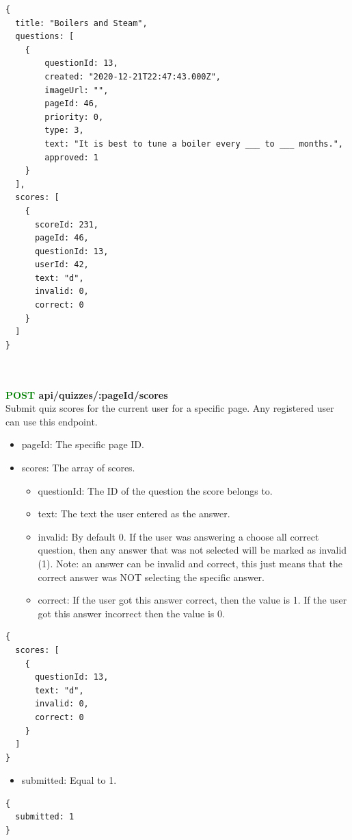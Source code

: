 \documentclass[onecolumn, draftclsnofoot,10pt, compsoc, usenames, dvipsnames]{IEEEtran}
\begin{document}
\begin{lstlisting}[caption=Example Response]
{ 
  title: "Boilers and Steam",
  questions: [
    {
        questionId: 13,
        created: "2020-12-21T22:47:43.000Z",
        imageUrl: "",
        pageId: 46,
        priority: 0,
        type: 3,
        text: "It is best to tune a boiler every ___ to ___ months.",
        approved: 1
    }
  ],
  scores: [
    {
      scoreId: 231,
      pageId: 46,
      questionId: 13,
      userId: 42,
      text: "d",
      invalid: 0,
      correct: 0
    }
  ]
}
\end{lstlisting}
\\~\\


\noindent
\textbf{\textcolor{Green}{POST} api/quizzes/:pageId/scores} \\
Submit quiz scores for the current user for a specific page. Any registered user can use this endpoint.
\begin{itemize}
    \item pageId: The specific page ID.
    \item scores: The array of scores.
    \begin{itemize}
        \item questionId: The ID of the question the score belongs to.
        \item text: The text the user entered as the answer.
        \item invalid: By default 0. If the user was answering a choose all correct question, then any answer that was not selected will be marked as invalid (1). Note: an answer can be invalid and correct, this just means that the correct answer was NOT selecting the specific answer.
        \item correct: If the user got this answer correct, then the value is 1. If the user got this answer incorrect then the value is 0.
    \end{itemize}
\end{itemize}
\begin{lstlisting}[caption=Example Request Body]
{ 
  scores: [
    {
      questionId: 13,
      text: "d",
      invalid: 0,
      correct: 0
    }
  ]
}
\end{lstlisting}
\begin{itemize}
    \item submitted: Equal to 1.
\end{itemize}
\begin{lstlisting}[caption=Example Response]
{
  submitted: 1
}
\end{lstlisting}
\\~\\
\end{document}
